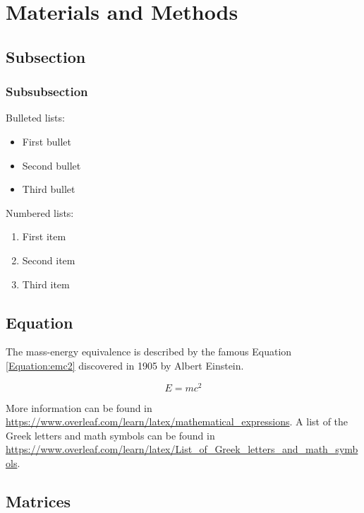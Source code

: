 \section{Materials and Methods}

\blindtext %


\subsection{Subsection}

\blindtext %

\subsubsection{Subsubsection}

Bulleted lists:
\begin{itemize}[leftmargin=*,labelsep=5.8mm]
\item	First bullet
\item	Second bullet
\item	Third bullet
\end{itemize}

Numbered lists:
\begin{enumerate}[leftmargin=*,labelsep=4.9mm]
\item	First item 
\item	Second item
\item	Third item
\end{enumerate}

\blindtext %

\subsection{Equation}

The mass-energy equivalence is described by the famous Equation \ref{Equation:emc2} discovered in 1905 by Albert Einstein.

\begin{equation}
\label{Equation:emc2}
E=mc^2
\end{equation}

 
More information can be found in \url{https://www.overleaf.com/learn/latex/mathematical_expressions}. A list of the Greek letters and math symbols can be found in \url{https://www.overleaf.com/learn/latex/List_of_Greek_letters_and_math_symbols}.

\subsection{Matrices}

